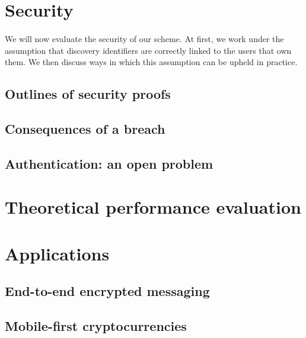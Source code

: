 	


\section{Security}
\label{sec:security}


\paragraph{} We will now evaluate the security of our scheme. At first, we work under the assumption that discovery identifiers are correctly linked to the users that own them. We then discuss ways in which this assumption can be upheld in practice.

	\subsection{Outlines of security proofs}

	\subsection{Consequences of a breach}
	
	\subsection{Authentication: an open problem}


\section{Theoretical performance evaluation}
\label{sec:performance}


\section{Applications}
\label{sec:applications}

	\subsection{End-to-end encrypted messaging}
	
	\subsection{Mobile-first cryptocurrencies}
